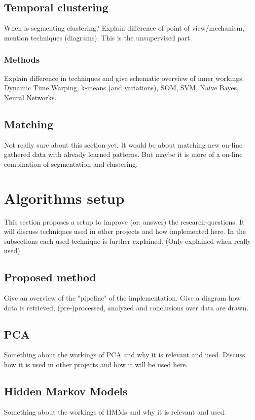 \documentclass[a4paper,10pt]{extarticle}
\begin{document}
  \subsection{Temporal clustering}
  When is segmenting clustering?
  Explain difference of point of view/mechanism, mention techniques (diagrams).
  This is the unsupervised part.

    \subsubsection{Methods}
    Explain difference in techniques and give schematic overview of inner workings.
    Dynamic Time Warping, k-means (and variations), SOM, SVM, Naive Bayes, Neural Networks.


  \subsection{Matching}
  Not really sure about this section yet.
  It would be about matching new on-line gathered data with already learned patterns.
  But maybe it is more of a on-line combination of segmentation and clustering.


\section{Algorithms setup}
\label{sec:Setup}
This section proposes a setup to improve (or: answer) the research-questions.
It will discuss techniques used in other projects and how implemented here.
In the subsections each used technique is further explained. (Only explained when really used)

  \subsection{Proposed method}
  Give an overview of the "pipeline" of the implementation.
  Give a diagram how data is retrieved, (pre-)processed, analyzed and conclusions over data are drawn.

  \subsection{PCA}
  Something about the workings of PCA and why it is relevant and used.
  Discuss how it is used in other projects and how it will be used here.

  \subsection{Hidden Markov Models}
  Something about the workings of HMMs and why it is relevant and used.
\end{document}
